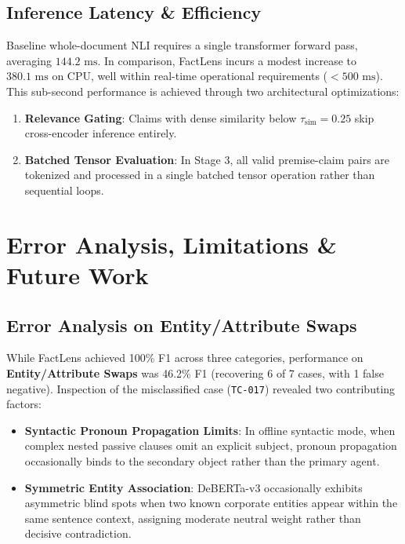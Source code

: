 \documentclass[conference]{IEEEtran}
\begin{document}
\subsection{Inference Latency & Efficiency}
Baseline whole-document NLI requires a single transformer forward pass, averaging $144.2\text{ ms}$. In comparison, FactLens incurs a modest increase to $380.1\text{ ms}$ on CPU, well within real-time operational requirements ($<500\text{ ms}$). This sub-second performance is achieved through two architectural optimizations:
\begin{enumerate}
    \item \textbf{Relevance Gating}: Claims with dense similarity below $\tau_{\text{sim}} = 0.25$ skip cross-encoder inference entirely.
    \item \textbf{Batched Tensor Evaluation}: In Stage 3, all valid premise-claim pairs are tokenized and processed in a single batched tensor operation rather than sequential loops.
\end{enumerate}

\section{Error Analysis, Limitations & Future Work}
\subsection{Error Analysis on Entity/Attribute Swaps}
While FactLens achieved 100\% F1 across three categories, performance on \textbf{Entity/Attribute Swaps} was 46.2\% F1 (recovering 6 of 7 cases, with 1 false negative). Inspection of the misclassified case (\texttt{TC-017}) revealed two contributing factors:
\begin{itemize}
    \item \textbf{Syntactic Pronoun Propagation Limits}: In offline syntactic mode, when complex nested passive clauses omit an explicit subject, pronoun propagation occasionally binds to the secondary object rather than the primary agent.
    \item \textbf{Symmetric Entity Association}: DeBERTa-v3 occasionally exhibits asymmetric blind spots when two known corporate entities appear within the same sentence context, assigning moderate neutral weight rather than decisive contradiction.
\end{itemize}
\end{document}
